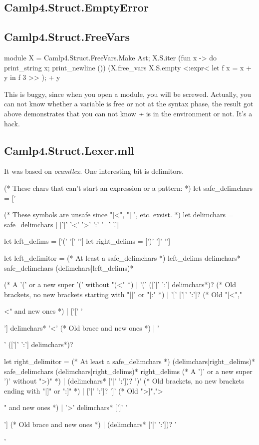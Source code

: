 \subsection{Camlp4.Struct.EmptyError}
\label{Camlp4.Struct.EmptyError}

\subsection{Camlp4.Struct.FreeVars}
\label{Camlp4.Struct.FreeVars}

\begin{ocamlcode}
module X = Camlp4.Struct.FreeVars.Make Ast;  
X.S.iter (fun x -> do
      {print_string x;
           print_newline ()}) (X.free_vars X.S.empty <:expr< let f x = x  + y  in f 3 >> );
+
y
\end{ocamlcode}

This is buggy, since when you open a module, you will be
screwed. Actually, you can not know whether a variable is free or not
at the syntax phase, the result got above demonstrates that you can
not know \textit{+} is in the environment or not. It's a hack.

\subsection{Camlp4.Struct.Lexer.mll}
\label{Camlp4.Struct.Lexer.mll}
It was based on \textit{ocamllex}. One interesting bit is delimitors.

\begin{ocamlcode}
  (* These chars that can't start an expression or a pattern: *)
  let safe_delimchars = ['%

  (* These symbols are unsafe since "[<", "[|", etc. exsist. *)
  let delimchars = safe_delimchars | ['|' '<' '>' ':' '=' '.']

  let left_delims  = ['(' '[' '{']
  let right_delims = [')' ']' '}']

  let left_delimitor =
    (* At least a safe_delimchars *)
    left_delims delimchars* safe_delimchars (delimchars|left_delims)*

  (* A '(' or a new super '(' without "(<" *)
  | '(' (['|' ':'] delimchars*)?
  (* Old brackets, no new brackets starting with "[|" or "[:" *)
  | '[' ['|' ':']?
  (* Old "[<","{<" and new ones *)
  | ['[' '{'] delimchars* '<'
  (* Old brace and new ones *)
  | '{' (['|' ':'] delimchars*)?

  let right_delimitor =
    (* At least a safe_delimchars *)
    (delimchars|right_delims)* safe_delimchars (delimchars|right_delims)* right_delims
  (* A ')' or a new super ')' without ">)" *)
  | (delimchars* ['|' ':'])? ')'
  (* Old brackets, no new brackets ending with "|]" or ":]" *)
  | ['|' ':']? ']'
  (* Old ">]",">}" and new ones *)
  | '>' delimchars* [']' '}']
  (* Old brace and new ones *)
  | (delimchars* ['|' ':'])? '}'
  
\end{ocamlcode}

